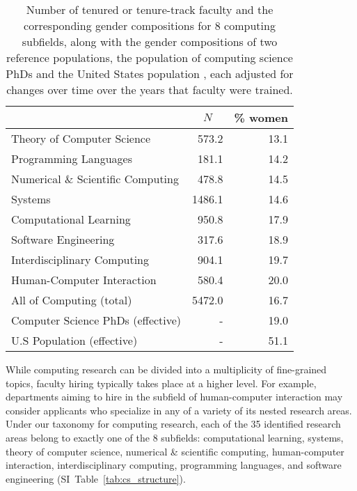 \documentclass[reprint, twocolumn, aps, nofootinbib, superscriptaddress, longbibliography]{revtex4-1}
\newcommand\mc[1]{\multicolumn{1}{c}{#1}} %
\begin{document}
\begin{table}[] 
\begin{tabular}{l *{2}{d{3.3}}} 
\toprule 
{} & \mc{$N$} & \mc{\% women} \\ 
\midrule\midrule 
Theory of Computer Science & 573.2 & 13.1 \\ 
Programming Languages & 181.1 & 14.2 \\ 
Numerical \& Scientific Computing & 478.8 & 14.5 \\ 
Systems & 1486.1 & 14.6 \\ 
Computational Learning & 950.8 & 17.9 \\ 
Software Engineering & 317.6 & 18.9 \\ 
Interdisciplinary Computing & 904.1 & 19.7 \\ 
Human-Computer Interaction & 580.4 & 20.0 \\ 
\midrule 
All of Computing (total) & 5472.0 & 16.7 \\ 
\midrule 
Computer Science PhDs (effective) & - & 19.0 \\ 
U.S Population (effective) & - & 51.1 \\ 
\bottomrule 
\end{tabular} 
\caption{Number of tenured or tenure-track faculty and the corresponding gender compositions for 8 computing subfields, along with the gender compositions of two reference populations, the population of computing science PhDs \cite{national2019national} and the United States population \cite{hobbs2002demographic, howden2011age, census2019quick}, each adjusted for changes over time over the years that faculty were trained.} \label{tab:frac_women} 
\end{table} 


While computing research can be divided into a multiplicity of fine-grained topics, faculty hiring typically takes place at a higher level. For example, departments aiming to hire in the subfield of human-computer interaction may consider applicants who specialize in any of a variety of its nested research areas. Under our taxonomy for computing research, each of the 35 identified research areas belong to exactly one of the 8 subfields: computational learning, systems, theory of computer science, numerical \& scientific computing, human-computer interaction, interdisciplinary computing, programming languages, and software engineering (SI~Table~\ref{tab:cs_structure}). 
\end{document}
